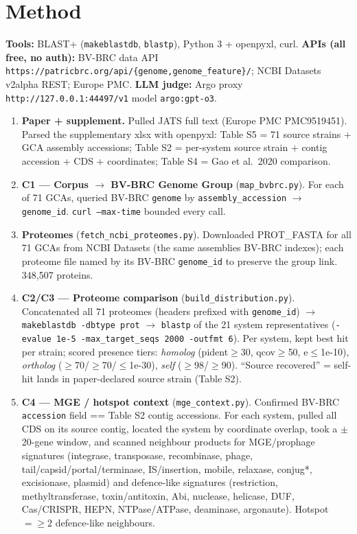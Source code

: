 \documentclass[11pt,letterpaper]{article}
\begin{document}
\section{Method}
\textbf{Tools:} BLAST+ (\texttt{makeblastdb}, \texttt{blastp}), Python 3 + openpyxl, curl. \textbf{APIs (all free, no auth):} BV-BRC data API \texttt{https://patricbrc.org/api/\{genome,genome\_feature\}/}; NCBI Datasets v2alpha REST; Europe PMC. \textbf{LLM judge:} Argo proxy \texttt{http://127.0.0.1:44497/v1} model \texttt{argo:gpt-o3}.

\begin{enumerate}
\item \textbf{Paper + supplement.} Pulled JATS full text (Europe PMC PMC9519451). Parsed the supplementary xlsx with openpyxl: Table S5 = 71 source strains + GCA assembly accessions; Table S2 = per-system source strain + contig accession + CDS + coordinates; Table S4 = Gao et al.\ 2020 comparison.
\item \textbf{C1 --- Corpus $\rightarrow$ BV-BRC Genome Group} (\texttt{map\_bvbrc.py}). For each of 71 GCAs, queried BV-BRC \texttt{genome} by \texttt{assembly\_accession} $\rightarrow$ \texttt{genome\_id}. \texttt{curl --max-time} bounded every call.
\item \textbf{Proteomes} (\texttt{fetch\_ncbi\_proteomes.py}). Downloaded PROT\_FASTA for all 71 GCAs from NCBI Datasets (the same assemblies BV-BRC indexes); each proteome file named by its BV-BRC \texttt{genome\_id} to preserve the group link. 348{,}507 proteins.
\item \textbf{C2/C3 --- Proteome comparison} (\texttt{build\_distribution.py}). Concatenated all 71 proteomes (headers prefixed with \texttt{genome\_id}) $\rightarrow$ \texttt{makeblastdb -dbtype prot} $\rightarrow$ \texttt{blastp} of the 21 system representatives (\texttt{-evalue 1e-5 -max\_target\_seqs 2000 -outfmt 6}). Per system, kept best hit per strain; scored presence tiers: \textit{homolog} (pident$\ge$30, qcov$\ge$50, e$\le$1e-10), \textit{ortholog} ($\ge$70/$\ge$70/$\le$1e-30), \textit{self} ($\ge$98/$\ge$90). ``Source recovered'' = self-hit lands in paper-declared source strain (Table S2).
\item \textbf{C4 --- MGE / hotspot context} (\texttt{mge\_context.py}). Confirmed BV-BRC \texttt{accession} field == Table S2 contig accessions. For each system, pulled all CDS on its source contig, located the system by coordinate overlap, took a $\pm$20-gene window, and scanned neighbour products for MGE/prophage signatures (integrase, transposase, recombinase, phage, tail/capsid/portal/terminase, IS/insertion, mobile, relaxase, conjug*, excisionase, plasmid) and defence-like signatures (restriction, methyltransferase, toxin/antitoxin, Abi, nuclease, helicase, DUF, Cas/CRISPR, HEPN, NTPase/ATPase, deaminase, argonaute). Hotspot $=\ge 2$ defence-like neighbours.

\end{enumerate}
\end{document}
